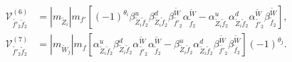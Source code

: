 \documentclass[final,3p,times,pdflatex]{elsarticle}
\begin{document}
\begin{align}
\mathcal{V}_{\tilde{f'}_2 \tilde{f}_2}^{(6)} &= |m_{\tilde{Z}_i}| m_{f'} \left[(-1)^{\theta_i}\beta_{\tilde{Z}_i \tilde{f}_2}^{u} \beta_{\tilde{Z}_i \tilde{f}_2}^{d} \beta_{\tilde{f'}_2}^{\tilde{W}} \alpha_{\tilde{f}_2}^{\tilde{W}} - \alpha_{\tilde{Z}_i \tilde{f}_2}^{u} \alpha_{\tilde{Z}_i \tilde{f}_2}^{d} \alpha_{\tilde{f'}_2}^{\tilde{W}} \beta_{\tilde{f}_2}^{\tilde{W}}\right], \\
\mathcal{V}_{\tilde{f'}_2 \tilde{f}_2}^{(7)} &= |m_{\tilde{W}_j}|m_{f}\left[ \alpha_{\tilde{Z}_i \tilde{f}_2}^{u} \beta_{\tilde{Z}_i \tilde{f}_2}^{d} \alpha_{\tilde{f'}_2}^{\tilde{W}} \alpha_{\tilde{f}_2}^{\tilde{W}} -  \beta_{\tilde{Z}_i \tilde{f}_2}^{u} \alpha_{\tilde{Z}_i \tilde{f}_2}^{d} \beta_{\tilde{f'}_2}^{\tilde{W}} \beta_{\tilde{f}_2}^{\tilde{W}}\right](-1)^{\theta_j}.
\end{align}
\end{document}
